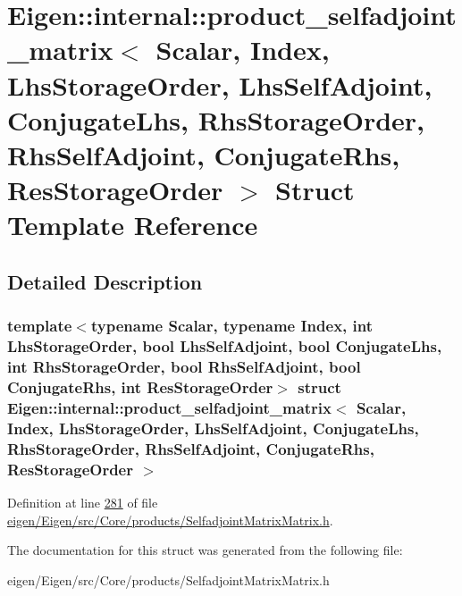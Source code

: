 \hypertarget{struct_eigen_1_1internal_1_1product__selfadjoint__matrix}{}\section{Eigen\+:\+:internal\+:\+:product\+\_\+selfadjoint\+\_\+matrix$<$ Scalar, Index, Lhs\+Storage\+Order, Lhs\+Self\+Adjoint, Conjugate\+Lhs, Rhs\+Storage\+Order, Rhs\+Self\+Adjoint, Conjugate\+Rhs, Res\+Storage\+Order $>$ Struct Template Reference}
\label{struct_eigen_1_1internal_1_1product__selfadjoint__matrix}


\subsection{Detailed Description}
\subsubsection*{template$<$typename Scalar, typename Index, int Lhs\+Storage\+Order, bool Lhs\+Self\+Adjoint, bool Conjugate\+Lhs, int Rhs\+Storage\+Order, bool Rhs\+Self\+Adjoint, bool Conjugate\+Rhs, int Res\+Storage\+Order$>$\newline
struct Eigen\+::internal\+::product\+\_\+selfadjoint\+\_\+matrix$<$ Scalar, Index, Lhs\+Storage\+Order, Lhs\+Self\+Adjoint, Conjugate\+Lhs, Rhs\+Storage\+Order, Rhs\+Self\+Adjoint, Conjugate\+Rhs, Res\+Storage\+Order $>$}



Definition at line \hyperlink{eigen_2_eigen_2src_2_core_2products_2_selfadjoint_matrix_matrix_8h_source_l00281}{281} of file \hyperlink{eigen_2_eigen_2src_2_core_2products_2_selfadjoint_matrix_matrix_8h_source}{eigen/\+Eigen/src/\+Core/products/\+Selfadjoint\+Matrix\+Matrix.\+h}.



The documentation for this struct was generated from the following file\+:\begin{DoxyCompactItemize}
\item 
eigen/\+Eigen/src/\+Core/products/\+Selfadjoint\+Matrix\+Matrix.\+h\end{DoxyCompactItemize}
